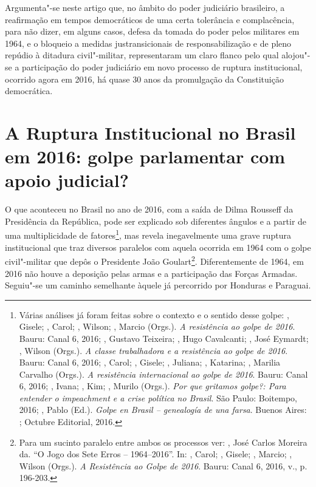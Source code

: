 Argumenta"-se neste artigo que, no âmbito do poder judiciário brasileiro,
a reafirmação em tempos democráticos de uma certa tolerância e
complacência, para não dizer, em alguns casos, defesa da tomada do poder
pelos militares em 1964, e o bloqueio a medidas justransicionais de
responsabilização e de pleno repúdio à ditadura civil"-militar,
representaram um claro flanco pelo qual alojou"-se a participação do
poder judiciário em novo processo de ruptura institucional, ocorrido
agora em 2016, há quase 30 anos da promulgação da Constituição
democrática.

\section{A Ruptura Institucional no Brasil em 2016: golpe parlamentar
com apoio judicial?}

O que aconteceu no Brasil no ano de 2016, com a saída de Dilma Rousseff
da Presidência da República, pode ser explicado sob diferentes ângulos e
a partir de uma multiplicidade de fatores\footnote{Várias análises já
  foram feitas sobre o contexto e o sentido desse golpe: ,
  Gisele; , Carol;  , Wilson; , Marcio (Orgs.).
  \emph{A resistência ao golpe de 2016}. Bauru: Canal 6, 2016; ,
  Gustavo Teixeira;  , Hugo Cavalcanti;
  , José Eymardt; 
  , Wilson (Orgs.). \emph{A classe trabalhadora e
  a resistência ao golpe de 2016}. Bauru: Canal 6, 2016; , Carol;
  , Gisele; ,
  Juliana; , Katarina;
  , Marilia Carvalho (Orgs.). \emph{A resistência
  internacional ao golpe de 2016}. Bauru: Canal 6, 2016; ,
  Ivana; , Kim; , Murilo (Orgs.). \emph{Por que gritamos
  golpe?: Para entender o impeachment e a crise política no Brasil}. São
  Paulo: Boitempo, 2016; , Pablo (Ed.). \emph{Golpe en Brasil
  -- genealogía de una farsa}. Buenos Aires: ; Octubre Editorial,
  2016.}, mas revela inegavelmente uma grave ruptura institucional que
traz diversos paralelos com aquela ocorrida em 1964 com o golpe
civil"-militar que depôs o Presidente João Goulart\footnote{Para um
  sucinto paralelo entre ambos os processos ver: , José
  Carlos Moreira da. ``O Jogo dos Sete Erros -- 1964--2016''. In: ,
  Carol; , Gisele; , Marcio;  , Wilson
  (Orgs.). \emph{A Resistência ao Golpe de 2016}. Bauru: Canal 6,
  2016, v., p. 196-203.}. Diferentemente de 1964, em 2016 não houve a
deposição pelas armas e a participação das Forças Armadas. Seguiu"-se um
caminho semelhante àquele já percorrido por Honduras e Paraguai.

